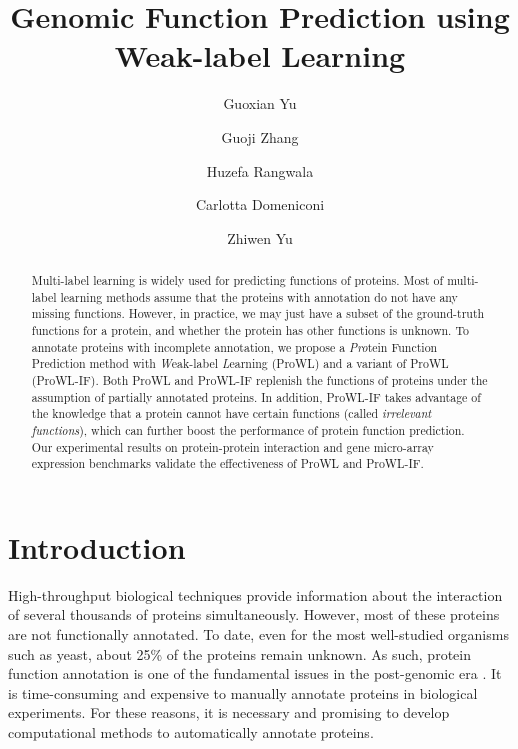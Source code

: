 \documentclass{llncs} %
\begin{document}
\title{Genomic Function Prediction using Weak-label Learning}
\author
{Guoxian Yu\and Guoji Zhang \and
 Huzefa Rangwala \and Carlotta Domeniconi \and Zhiwen Yu
}
\maketitle
\begin{abstract}
Multi-label learning is widely used for predicting functions of proteins. Most of
multi-label learning methods assume that the proteins with annotation do
not have any missing  functions. However, in practice, we may just have a
subset of the ground-truth functions for a protein, and whether the protein has other functions is unknown. To annotate proteins with incomplete annotation, we propose a \textit{Pro}tein Function Prediction  method with \textit{W}eak-label \textit{L}earning (ProWL) and a variant of ProWL (ProWL-IF). Both ProWL and ProWL-IF replenish the functions of proteins under the assumption of partially annotated proteins. In addition, ProWL-IF takes advantage of the knowledge that a protein cannot have certain functions (called \textit{irrelevant functions}), which can further boost the performance of protein function prediction. Our experimental results on protein-protein interaction and gene micro-array expression benchmarks validate the effectiveness of ProWL and ProWL-IF.
\end{abstract}

\section{Introduction}
\label{introduction}
High-throughput biological techniques provide information about the interaction of several thousands of proteins simultaneously. However, most of these proteins are not functionally annotated. To date, even for the most well-studied organisms such as yeast, about 25\% of the proteins remain unknown. As such, protein function annotation is one of the fundamental issues in the post-genomic era \cite{sharan2007network}. It is time-consuming and expensive to manually annotate proteins in biological experiments. For these reasons, it is necessary and promising to develop computational methods to automatically annotate proteins.
\end{document}
